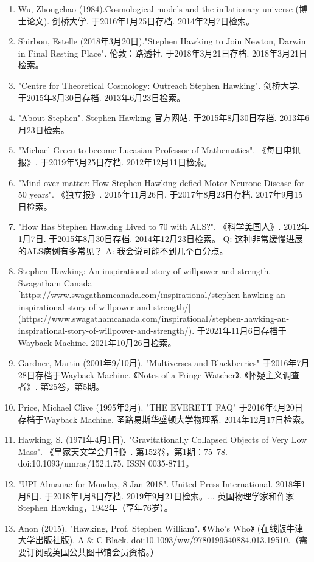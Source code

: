 \begin{enumerate}
\item Wu, Zhongchao (1984).Cosmological models and the inflationary universe (博士论文). 剑桥大学. 于2016年1月25日存档. 2014年2月7日检索。  
\item Shirbon, Estelle (2018年3月20日)."Stephen Hawking to Join Newton, Darwin in Final Resting Place". 伦敦：路透社. 于2018年3月21日存档. 2018年3月21日检索。  
\item "Centre for Theoretical Cosmology: Outreach Stephen Hawking". 剑桥大学. 于2015年8月30日存档. 2013年6月23日检索。  
\item "About Stephen". Stephen Hawking 官方网站. 于2015年8月30日存档. 2013年6月23日检索。  
\item "Michael Green to become Lucasian Professor of Mathematics". 《每日电讯报》. 于2019年5月25日存档. 2012年12月11日检索。  
\item "Mind over matter: How Stephen Hawking defied Motor Neurone Disease for 50 years". 《独立报》. 2015年11月26日. 于2017年8月23日存档. 2017年9月15日检索。  
\item "How Has Stephen Hawking Lived to 70 with ALS?". 《科学美国人》. 2012年1月7日. 于2015年8月30日存档. 2014年12月23日检索。  
Q: 这种非常缓慢进展的ALS病例有多常见？  
A: 我会说可能不到几个百分点。
\item Stephen Hawking: An inspirational story of willpower and strength. Swagatham Canada [https://www.swagathamcanada.com/inspirational/stephen-hawking-an-inspirational-story-of-willpower-and-strength/](https://www.swagathamcanada.com/inspirational/stephen-hawking-an-inspirational-story-of-willpower-and-strength/). 于2021年11月6日存档于Wayback Machine. 2021年10月26日检索。  
\item Gardner, Martin (2001年9/10月). "Multiverses and Blackberries" 于2016年7月28日存档于Wayback Machine. 《Notes of a Fringe-Watcher》. 《怀疑主义调查者》. 第25卷，第5期。  
\item Price, Michael Clive (1995年2月). "THE EVERETT FAQ" 于2016年4月20日存档于Wayback Machine. 圣路易斯华盛顿大学物理系. 2014年12月17日检索。  
\item Hawking, S. (1971年4月1日). "Gravitationally Collapsed Objects of Very Low Mass". 《皇家天文学会月刊》. 第152卷，第1期：75–78. doi:10.1093/mnras/152.1.75. ISSN 0035-8711。  
\item "UPI Almanac for Monday, 8 Jan 2018". United Press International. 2018年1月8日. 于2018年1月8日存档. 2019年9月21日检索。... 英国物理学家和作家Stephen Hawking，1942年（享年76岁）。  
\item Anon (2015). "Hawking, Prof. Stephen William". 《Who’s Who》 (在线版牛津大学出版社版). A & C Black. doi:10.1093/ww/9780199540884.013.19510.（需要订阅或英国公共图书馆会员资格。）  

\end{enumerate}
